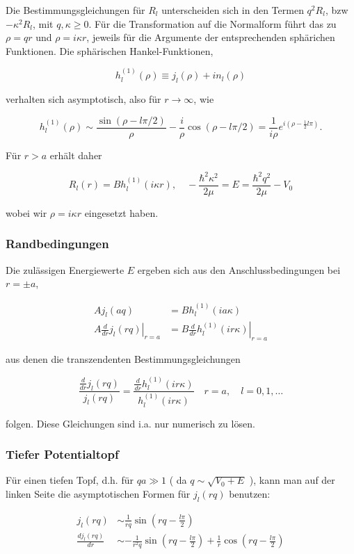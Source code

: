 \documentclass[10pt, letterpaper]{article}
\begin{document}
Die Bestimmungsgleichungen für $R_{l}$ unterscheiden sich in den Termen $q^{2} R_{l}$, bzw $-\kappa^{2} R_{l}$, mit $q, \kappa \geq 0$. Für die Transformation auf die Normalform führt das zu $\rho=q r$ und $\rho=i \kappa r$, jeweils für die Argumente der entsprechenden sphärichen Funktionen. Die sphärischen Hankel-Funktionen,

$$
h_{l}^{(1)}(\rho) \equiv j_{l}(\rho)+i n_{l}(\rho)
$$

verhalten sich asymptotisch, also für $r \rightarrow \infty$, wie

$$
h_{l}^{(1)}(\rho) \sim \frac{\sin (\rho-l \pi / 2)}{\rho}-\frac{i}{\rho} \cos (\rho-l \pi / 2)=\frac{1}{i \rho} e^{i\left(\rho-\frac{1}{2} l \pi\right)} .
$$

Für $r>a$ erhält daher

$$
R_{l}(r)=B h_{l}^{(1)}(i \kappa r), \quad-\frac{\hbar^{2} \kappa^{2}}{2 \mu}=E=\frac{\hbar^{2} q^{2}}{2 \mu}-V_{0}
$$

wobei wir $\rho=i \kappa r$ eingesetzt haben.

\subsubsection*{Randbedingungen}
Die zulässigen Energiewerte $E$ ergeben sich aus den Anschlussbedingungen bei $r= \pm a$,

$$
\begin{aligned}
A j_{l}(a q) & =B h_{l}^{(1)}(i a \kappa) \\
\left.A \frac{d}{d r} j_{l}(r q)\right|_{r=a} & =\left.B \frac{d}{d r} h_{l}^{(1)}(i r \kappa)\right|_{r=a}
\end{aligned}
$$

aus denen die transzendenten Bestimmungsgleichungen

$$
\frac{\frac{d}{d r} j_{l}(r q)}{j_{l}(r q)}=\frac{\frac{d}{d r} h_{l}^{(1)}(i r \kappa)}{h_{l}^{(1)}(i r \kappa)} \quad r=a, \quad l=0,1, \ldots
$$

folgen. Diese Gleichungen sind i.a. nur numerisch zu lösen.

\subsubsection*{Tiefer Potentialtopf}
Für einen tiefen Topf, d.h. für $q a \gg 1$ ( da $q \sim \sqrt{V_{0}+E}$ ), kann man auf der linken Seite die asymptotischen Formen für $j_{l}(r q)$ benutzen:

$$
\begin{aligned}
j_{l}(r q) & \sim \frac{1}{r q} \sin \left(r q-\frac{l \pi}{2}\right) \\
\frac{d j_{l}(r q)}{d r} & \sim-\frac{1}{r^{2} q} \sin \left(r q-\frac{l \pi}{2}\right)+\frac{1}{r} \cos \left(r q-\frac{l \pi}{2}\right)
\end{aligned}
$$
\end{document}
